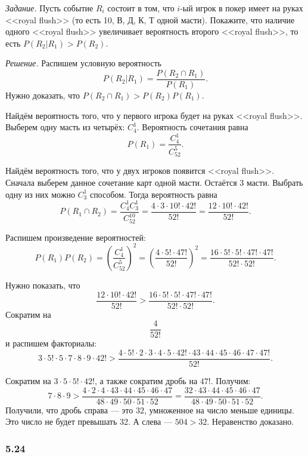 \textit{Задание.} Пусть событие $R_i$ состоит в том, что $i$-ый игрок в покер имеет на руках <<royal flush>> (то есть 10, В, Д, К, Т одной масти).
Покажите, что наличие одного <<royal flush>> увеличивает вероятность второго <<royal flush>>, то есть
$P \left( \left. R_2 \right| R_1 \right) >
P \left( R_2 \right) $.

\textit{Решение.} Распишем условную вероятность
$$P \left( \left. R_2 \right| R_1 \right) =
\frac{P \left( R_2 \cap R_1 \right) }{P \left( R_1 \right) }.$$
Нужно доказать, что $P \left( R_2 \cap R_1 \right) > P \left( R_2 \right) P \left( R_1 \right) $.

Найдём вероятность того, что у первого игрока будет на руках <<royal flush>>.
Выберем одну масть из четырёх: $C_4^1$.
Вероятность сочетания равна
$$P \left( R_1 \right) =
\frac{C_4^1}{C_{52}^5}.$$

Найдём вероятность того, что у двух игроков появится <<royal flush>>.
Сначала выберем данное сочетание карт одной масти.
Остаётся 3 масти.
Выбрать одну из них можно $C_3^1$ способом.
Тогда вероятность равна
$$P \left( R_1 \cap R_2 \right) =
\frac{C_4^1C_3^1}{C_{52}^{10}} =
\frac{4 \cdot 3 \cdot 10! \cdot 42!}{52!} =
\frac{12 \cdot 10! \cdot 42!}{52!}.$$

Распишем произведение вероятностей:
$$P \left(R_1 \right) P \left( R_2 \right) =
\left( \frac{C_4^1}{C_{52}^{5}} \right)^2 =
\left( \frac{4 \cdot 5! \cdot 47!}{52!}\right)^2 =
\frac{16 \cdot 5! \cdot 5! \cdot 47! \cdot 47!}{52! \cdot 52!}.$$

Нужно показать, что
$$\frac{12 \cdot 10! \cdot 42!}{52!} >
\frac{16 \cdot 5! \cdot 5! \cdot 47! \cdot 47!}{52! \cdot 52!}.$$
Сократим на
$$ \frac{4}{52!}$$
и распишем факториалы:
$$3 \cdot 5! \cdot 5 \cdot 7 \cdot 8 \cdot 9 \cdot 42! >
\frac{4 \cdot 5! \cdot 2 \cdot 3 \cdot 4 \cdot 5 \cdot 42! \cdot 43 \cdot 44 \cdot 45 \cdot 46 \cdot 47 \cdot 47!}{52!}.$$

Сократим на $3 \cdot 5 \cdot 5! \cdot 42!$, а также сократим дробь на $47!$.
Получим:
$$7 \cdot 8 \cdot 9 >
\frac{4 \cdot 2 \cdot 4 \cdot 43 \cdot 44 \cdot 45 \cdot 46 \cdot 47}{48 \cdot 49 \cdot 50 \cdot 51 \cdot 52} =
\frac{32 \cdot 43 \cdot 44 \cdot 45 \cdot 46 \cdot 47}{48 \cdot 49 \cdot 50 \cdot 51 \cdot 52}.$$
Получили, что дробь справа --- это $32$, умноженное на число меньше единицы.
Это число не будет превышать 32.
А слева --- $504 > 32$.
Неравенство доказано.

\subsubsection*{5.24}

